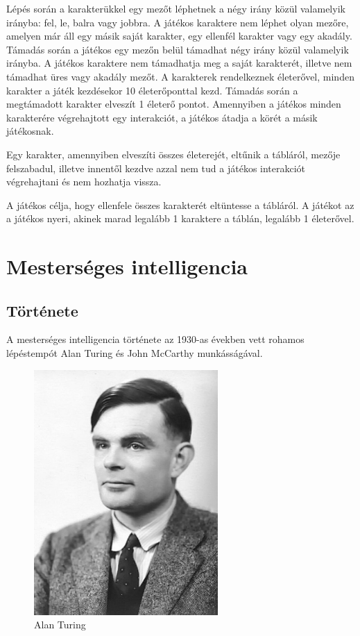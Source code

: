 \documentclass[
]{thesis-ekf}
\theoremstyle{definition}
\theoremstyle{remark}
\begin{document}
Lépés során a karakterükkel egy mezőt léphetnek a négy irány közül valamelyik irányba: fel, le, balra vagy jobbra. A játékos karaktere nem léphet olyan mezőre, amelyen már áll egy másik saját karakter, egy ellenfél karakter vagy egy akadály. Támadás során a játékos egy mezőn belül támadhat négy irány közül valamelyik irányba. A játékos karaktere nem támadhatja meg a saját karakterét, illetve nem támadhat üres vagy akadály mezőt. A karakterek rendelkeznek életerővel, minden karakter a játék kezdésekor 10 életerőponttal kezd. Támadás során a megtámadott karakter elveszít 1 életerő pontot. Amennyiben a játékos minden karakterére végrehajtott egy interakciót, a játékos átadja a körét a másik játékosnak.

Egy karakter, amennyiben elveszíti összes életerejét, eltűnik a tábláról, mezője felszabadul, illetve innentől kezdve azzal nem tud a játékos interakciót végrehajtani és nem hozhatja vissza.
 
A játékos célja, hogy ellenfele összes karakterét eltüntesse a tábláról. A játékot az a játékos nyeri, akinek marad legalább 1 karaktere a táblán, legalább 1 életerővel.

\chapter{Mesterséges intelligencia}

\section{Története}

A mesterséges intelligencia története az 1930-as években vett rohamos lépéstempót Alan Turing és John McCarthy munkásságával.

\begin{figure}[h!]
	\centering
	\includegraphics[width=7cm]{./pictures/Alan_Turing.jpg}
	\caption{Alan Turing}
	\label{Turing}
\end{figure} 
\end{document}
